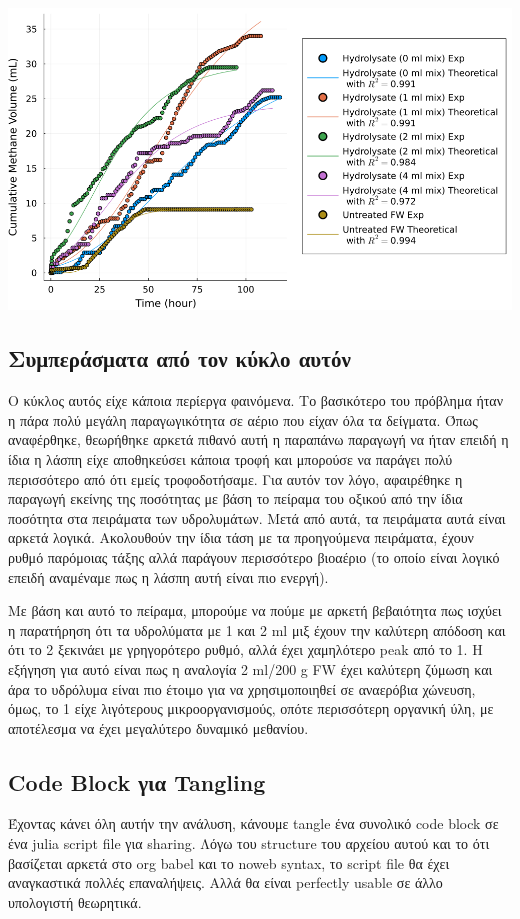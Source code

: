 \documentclass[11pt]{article}
\begin{document}
\begin{center}
\includegraphics[width=.9\linewidth]{../plots/BMPs/methane_s2_r1_comp.png}
\end{center}

\subsection{Συμπεράσματα από τον κύκλο αυτόν}
\label{sec:org5dfcf53}
Ο κύκλος αυτός είχε κάποια περίεργα φαινόμενα. Το βασικότερο του πρόβλημα ήταν η πάρα πολύ μεγάλη παραγωγικότητα σε αέριο που είχαν όλα τα δείγματα. Όπως αναφέρθηκε, θεωρήθηκε αρκετά πιθανό αυτή η παραπάνω παραγωγή να ήταν επειδή η ίδια η λάσπη είχε αποθηκεύσει κάποια τροφή και μπορούσε να παράγει πολύ περισσότερο από ότι εμείς τροφοδοτήσαμε. Για αυτόν τον λόγο, αφαιρέθηκε η παραγωγή εκείνης της ποσότητας με βάση το πείραμα του οξικού από την ίδια ποσότητα στα πειράματα των υδρολυμάτων. Μετά από αυτά, τα πειράματα αυτά είναι αρκετά λογικά. Ακολουθούν την ίδια τάση με τα προηγούμενα πειράματα, έχουν ρυθμό παρόμοιας τάξης αλλά παράγουν περισσότερο βιοαέριο (το οποίο είναι λογικό επειδή αναμέναμε πως η λάσπη αυτή είναι πιο ενεργή).

Με βάση και αυτό το πείραμα, μπορούμε να πούμε με αρκετή βεβαιότητα πως ισχύει η παρατήρηση ότι τα υδρολύματα με 1 και 2 ml μιξ έχουν την καλύτερη απόδοση και ότι το 2 ξεκινάει με γρηγορότερο ρυθμό, αλλά έχει χαμηλότερο peak από το 1. Η εξήγηση για αυτό είναι πως η αναλογία 2 ml/200 g FW έχει καλύτερη ζύμωση και άρα το υδρόλυμα είναι πιο έτοιμο για να χρησιμοποιηθεί σε αναερόβια χώνευση, όμως, το 1 είχε λιγότερους μικροοργανισμούς, οπότε περισσότερη οργανική ύλη, με αποτέλεσμα να έχει μεγαλύτερο δυναμικό μεθανίου.

\subsection{Code Block για Tangling}
\label{sec:orgb427c0f}
Έχοντας κάνει όλη αυτήν την ανάλυση, κάνουμε tangle ένα συνολικό code block σε ένα julia script file για sharing. Λόγω του structure του αρχείου αυτού και το ότι βασίζεται αρκετά στο org babel και το noweb syntax, το script file θα έχει αναγκαστικά πολλές επαναλήψεις. Αλλά θα είναι perfectly usable σε άλλο υπολογιστή θεωρητικά.
\end{document}
